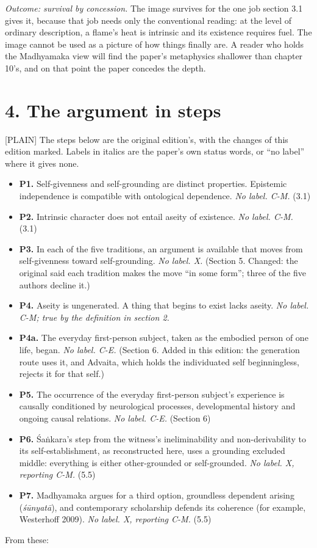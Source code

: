 \documentclass[11pt]{article}
\newcommand{\register}[1]{{\ttfamily\small #1}}
\begin{document}
\emph{Outcome: survival by concession.} The image survives for the one job section 3.1 gives it, because that job needs only the conventional reading: at the level of ordinary description, a flame's heat is intrinsic and its existence requires fuel. The image cannot be used as a picture of how things finally are. A reader who holds the Madhyamaka view will find the paper's metaphysics shallower than chapter 10's, and on that point the paper concedes the depth.

\section*{4. The argument in steps}

\register{[PLAIN]} The steps below are the original edition's, with the changes of this edition marked. Labels in italics are the paper's own status words, or ``no label'' where it gives none.

\begin{itemize}
\item \textbf{P1.} Self-givenness and self-grounding are distinct properties. Epistemic independence is compatible with ontological dependence. \emph{No label. C-M.} (3.1)
\item \textbf{P2.} Intrinsic character does not entail aseity of existence. \emph{No label. C-M.} (3.1)
\item \textbf{P3.} In each of the five traditions, an argument is available that moves from self-givenness toward self-grounding. \emph{No label. X.} (Section 5. Changed: the original said each tradition makes the move ``in some form''; three of the five authors decline it.)
\item \textbf{P4.} Aseity is ungenerated. A thing that begins to exist lacks aseity. \emph{No label. C-M; true by the definition in section 2.}
\item \textbf{P4a.} The everyday first-person subject, taken as the embodied person of one life, began. \emph{No label. C-E.} (Section 6. Added in this edition: the generation route uses it, and Advaita, which holds the individuated self beginningless, rejects it for that self.)
\item \textbf{P5.} The occurrence of the everyday first-person subject's experience is causally conditioned by neurological processes, developmental history and ongoing causal relations. \emph{No label. C-E.} (Section 6)
\item \textbf{P6.} Śaṅkara's step from the witness's ineliminability and non-derivability to its self-establishment, as reconstructed here, uses a grounding excluded middle: everything is either other-grounded or self-grounded. \emph{No label. X, reporting C-M.} (5.5)
\item \textbf{P7.} Madhyamaka argues for a third option, groundless dependent arising (\emph{śūnyatā}), and contemporary scholarship defends its coherence (for example, Westerhoff 2009). \emph{No label. X, reporting C-M.} (5.5)
\end{itemize}
From these:
\end{document}
